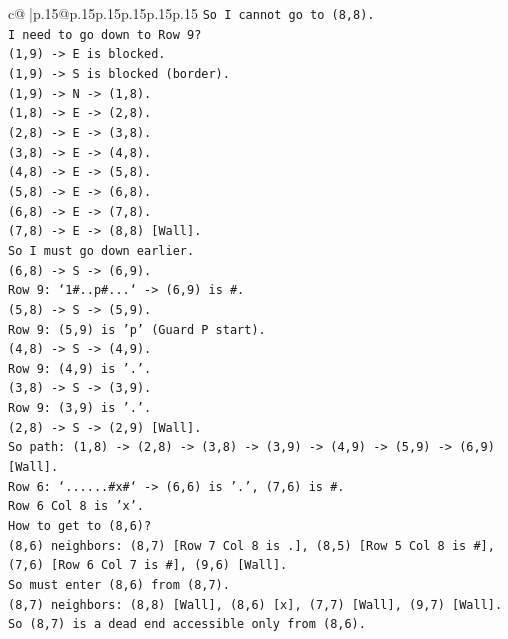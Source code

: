 \documentclass{article}
\begin{document}
{\begin{supertabular}{c@{$\;$}|p{.15\linewidth}@{}p{.15\linewidth}p{.15\linewidth}p{.15\linewidth}p{.15\linewidth}p{.15\linewidth}}
{{{\texttt{So I cannot go to (8,8).} \\
\texttt{I need to go down to Row 9?} \\
\texttt{(1,9) {-}> E is blocked.} \\
\texttt{(1,9) {-}> S is blocked (border).} \\
\texttt{(1,9) {-}> N {-}> (1,8).} \\
\texttt{(1,8) {-}> E {-}> (2,8).} \\
\texttt{(2,8) {-}> E {-}> (3,8).} \\
\texttt{(3,8) {-}> E {-}> (4,8).} \\
\texttt{(4,8) {-}> E {-}> (5,8).} \\
\texttt{(5,8) {-}> E {-}> (6,8).} \\
\texttt{(6,8) {-}> E {-}> (7,8).} \\
\texttt{(7,8) {-}> E {-}> (8,8) {[}Wall{]}.} \\
\texttt{So I must go down earlier.} \\
\texttt{(6,8) {-}> S {-}> (6,9).} \\
\texttt{Row 9: `1\#..p\#...` {-}> (6,9) is \#.} \\
\texttt{(5,8) {-}> S {-}> (5,9).} \\
\texttt{Row 9: (5,9) is 'p' (Guard P start).} \\
\texttt{(4,8) {-}> S {-}> (4,9).} \\
\texttt{Row 9: (4,9) is '.'.} \\
\texttt{(3,8) {-}> S {-}> (3,9).} \\
\texttt{Row 9: (3,9) is '.'.} \\
\texttt{(2,8) {-}> S {-}> (2,9) {[}Wall{]}.} \\
\texttt{So path: (1,8) {-}> (2,8) {-}> (3,8) {-}> (3,9) {-}> (4,9) {-}> (5,9) {-}> (6,9) {[}Wall{]}.} \\
\texttt{Row 6: `......\#x\#` {-}> (6,6) is '.', (7,6) is \#.} \\
\texttt{Row 6 Col 8 is 'x'.} \\
\texttt{How to get to (8,6)?} \\
\texttt{(8,6) neighbors: (8,7) {[}Row 7 Col 8 is .{]}, (8,5) {[}Row 5 Col 8 is \#{]}, (7,6) {[}Row 6 Col 7 is \#{]}, (9,6) {[}Wall{]}.} \\
\texttt{So must enter (8,6) from (8,7).} \\
\texttt{(8,7) neighbors: (8,8) {[}Wall{]}, (8,6) {[}x{]}, (7,7) {[}Wall{]}, (9,7) {[}Wall{]}.} \\
\texttt{So (8,7) is a dead end accessible only from (8,6).} \\
}}}
\end{supertabular}}
\end{document}
